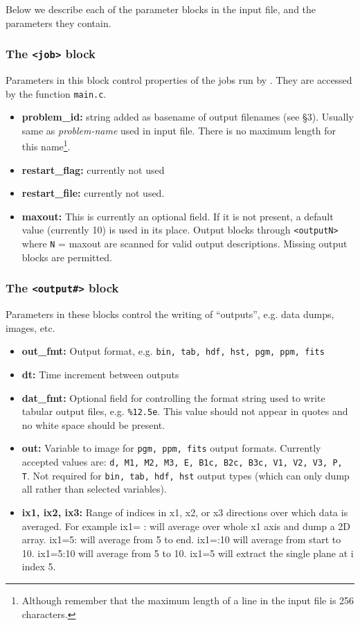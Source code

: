 Below we describe each of the parameter blocks in the input file,
and the parameters they contain.

\subsubsection{The {\tt <job>} block}

Parameters in this block control properties of the jobs run by \ath.
They are accessed by the function {\tt main.c}.
\begin{itemize}
\item {\bf problem\_id:}
string added as basename of output filenames (see \S 3).  Usually same
as {\it problem-name} used in input file.  There is no maximum length
for this name\footnote{Although remember that the maximum length of a
line in the input file is 256 characters.}.
\item {\bf restart\_flag:} currently not used
\item {\bf restart\_file:} currently not used. 
\item {\bf maxout:} This is currently an optional field.  If it is not
present, a default value (currently 10) is used in its place.  Output
blocks {\tt<output1>} through {\tt<outputN>} where {\tt N} = maxout
are scanned for valid output descriptions.  Missing output
blocks are permitted.
\end{itemize}

\subsubsection{The {\tt <output\#>} block}

Parameters in these blocks control the writing of ``outputs'',
e.g. data dumps, images, etc.
\begin{itemize}
\item {\bf out\_fmt:} Output format, e.g. 
{\tt bin, tab, hdf, hst, pgm, ppm, fits}
\item {\bf dt:} Time increment between outputs
\item {\bf dat\_fmt:} Optional field for controlling the format string used 
to write tabular output files, e.g. {\tt \%12.5e}.  This value should
not appear in quotes and no white space should be present.
\item {\bf out:} Variable to image for {\tt pgm, ppm, fits} output formats.
Currently accepted values are:
{\tt d, M1, M2, M3, E, B1c, B2c, B3c, V1, V2, V3, P, T}.  Not required for
{\tt bin, tab, hdf, hst} output types (which can only dump all rather than
selected variables).
\item {\bf ix1, ix2, ix3:} Range of indices in x1, x2, or x3 directions over
which data is averaged.  For example ix1= : will average over whole x1 axis
and dump a 2D array.  ix1=5: will average from 5 to end.  ix1=:10 will
average from start to 10.  ix1=5:10 will average from 5 to 10.  ix1=5
will extract the single plane at i index 5.
\end{itemize}

